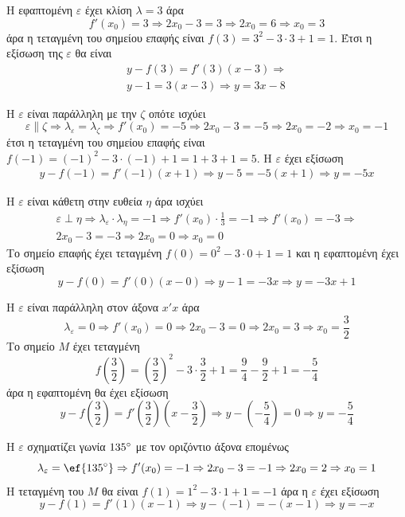 \documentclass[a4paper,11pt,twoside]{article}
\begin{document}
\begin{alist}
\item Η εφαπτομένη $\varepsilon$ έχει κλίση $\lambda=3$ άρα
\[f'(x_0)=3\Rightarrow2x_0-3=3\Rightarrow2x_0=6\Rightarrow x_0=3\]
άρα η τεταγμένη του σημείου επαφής είναι $f(3)=3^2-3\cdot3+1=1$. Έτσι η εξίσωση της $\varepsilon$ θα είναι
\begin{gather*}
y-f(3)=f'(3)(x-3)\Rightarrow\\
y-1=3(x-3)\Rightarrow y=3x-8
\end{gather*}
\item Η $\varepsilon$ είναι παράλληλη με την $\zeta$ οπότε ισχύει
\[\varepsilon\parallel\zeta\Rightarrow\lambda_{\varepsilon}=\lambda_{\zeta}\Rightarrow f'(x_0)=-5\Rightarrow 2x_0-3=-5\Rightarrow 2x_0=-2\Rightarrow x_0=-1\]
έτσι η τεταγμένη του σημείου επαφής είναι $f(-1)=(-1)^2-3\cdot(-1)+1=1+3+1=5$. Η $\varepsilon$ έχει εξίσωση 
\begin{gather*}
y-f(-1)=f'(-1)(x+1)\Rightarrow
y-5=-5(x+1)\Rightarrow y=-5x
\end{gather*}
\item Η $\varepsilon$ είναι κάθετη στην ευθεία $\eta$ άρα ισχύει
\begin{gather*}
\varepsilon\perp\eta\Rightarrow \lambda_{\varepsilon}\cdot\lambda_{\eta}=-1\Rightarrow f'(x_0)\cdot\frac{1}{3}=-1\Rightarrow f'(x_0)=-3\Rightarrow\\
2x_0-3=-3\Rightarrow 2x_0=0\Rightarrow x_0=0
\end{gather*}
Το σημείο επαφής έχει τεταγμένη $f(0)=0^2-3\cdot 0+1=1$ και η εφαπτομένη έχει εξίσωση
\[y-f(0)=f'(0)(x-0)\Rightarrow y-1=-3x\Rightarrow y=-3x+1\]
\item Η $\varepsilon$ είναι παράλληλη στον άξονα $x'x$ άρα
\[\lambda_{\varepsilon}=0\Rightarrow f'(x_0)=0\Rightarrow 2x_0-3=0\Rightarrow 2x_0=3\Rightarrow x_0=\frac{3}{2}\]
Το σημείο $M$ έχει τεταγμένη
\[ f\left(\frac{3}{2}\right)=\left(\frac{3}{2}\right)^2-3\cdot\frac{3}{2}+1=\frac{9}{4}-\frac{9}{2}+1=-\frac{5}{4} \]
άρα η εφαπτομένη θα έχει εξίσωση
\[ y-f\left(\frac{3}{2}\right)=f'\left(\frac{3}{2}\right)\left(x-\frac{3}{2}\right)\Rightarrow y-\left(-\frac{5}{4}\right)=0\Rightarrow y=-\frac{5}{4} \]
\item Η $\varepsilon$ σχηματίζει γωνία $135\degree$ με τον οριζόντιο άξονα επομένως
\[ \lambda_{\varepsilon}=\ef{135\degree}\Rightarrow f'(x_0)=-1\Rightarrow 2x_0-3=-1\Rightarrow 2x_0=2\Rightarrow x_0=1 \]
Η τεταγμένη του $M$ θα είναι $f(1)=1^2-3\cdot 1+1=-1$ άρα η $\varepsilon$ έχει εξίσωση
\[ y-f(1)=f'(1)(x-1)\Rightarrow y-(-1)=-(x-1)\Rightarrow y=-x \]
\end{alist}
\end{document}
